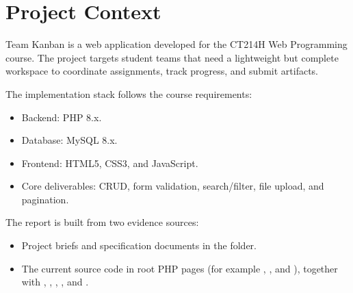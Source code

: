\section{Project Context}

Team Kanban is a web application developed for the CT214H Web Programming course.
The project targets student teams that need a lightweight but complete workspace to coordinate assignments,
track progress, and submit artifacts.

The implementation stack follows the course requirements:
\begin{itemize}
    \item Backend: PHP 8.x.
    \item Database: MySQL 8.x.
    \item Frontend: HTML5, CSS3, and JavaScript.
    \item Core deliverables: CRUD, form validation, search/filter, file upload, and pagination.
\end{itemize}

The report is built from two evidence sources:
\begin{itemize}
    \item Project briefs and specification documents in the  folder.
    \item The current source code in root PHP pages (for example , , and ), together with , , , , and .
\end{itemize}
